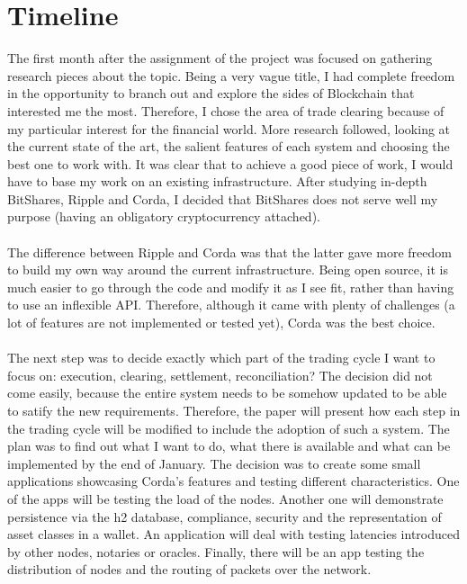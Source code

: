 \documentclass[12pt,twoside]{article}
\begin{document}
\section{Timeline}
The first month after the assignment of the project was focused on gathering research pieces about the topic. Being a very vague title, I had complete freedom in the opportunity to branch out and explore the sides of Blockchain that interested me the most. Therefore, I chose the area of trade clearing because of my particular interest for the financial world. More research followed, looking at the current state of the art, the salient features of each system and choosing the best one to work with. It was clear that to achieve a good piece of work, I would have to base my work on an existing infrastructure. After studying in-depth BitShares, Ripple and Corda, I decided that BitShares does not serve well my purpose (having an obligatory cryptocurrency attached).
\\ \\
The difference between Ripple and Corda was that the latter gave more freedom to build my own way around the current infrastructure. Being open source, it is much easier to go through the code and modify it as I see fit, rather than having to use an inflexible API. Therefore, although it came with plenty of challenges (a lot of features are not implemented or tested yet), Corda was the best choice. 
\\ \\
The next step was to decide exactly which part of the trading cycle I want to focus on: execution, clearing, settlement, reconciliation? The decision did not come easily, because the entire system needs to be somehow updated to be able to satify the new requirements. Therefore, the paper will present how each step in the trading cycle will be modified to include the adoption of such a system. The plan was to find out what I want to do, what there is available and what can be implemented by the end of January. The decision was to create some small applications showcasing Corda's features and testing different characteristics. One of the apps will be testing the load of the nodes. Another one will demonstrate persistence via the h2 database, compliance, security and the representation of asset classes in a wallet. An application will deal with testing latencies introduced by other nodes, notaries or oracles. Finally, there will be an app testing the distribution of nodes and the routing of packets over the network.
\\ \\
\end{document}

